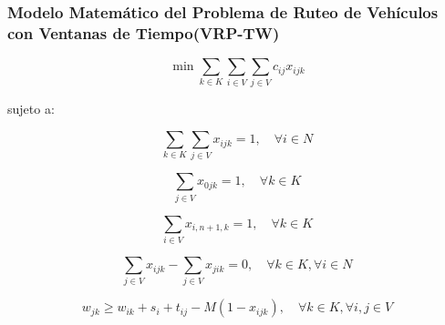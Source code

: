 \documentclass[12pt,titlepage,twoside,openright]{book}
\begin{document}
\subsubsection*{Modelo Matemático del Problema de Ruteo de Vehículos con Ventanas de Tiempo(VRP-TW)}

\begin{equation}
	\min \sum_{k \in K} \sum_{i \in V} \sum_{j \in V} c_{ij} x_{ijk}
	\label{eq:VRPTW_obj}
\end{equation}

sujeto a:

\begin{equation}
	\sum_{k \in K} \sum_{j \in V} x_{ijk} = 1, \quad \forall i \in N
	\label{eq:VRPTW_visit_once}
\end{equation}

\begin{equation}
	\sum_{j \in V} x_{0jk} = 1, \quad \forall k \in K
	\label{eq:VRPTW_start_depot}
\end{equation}

\begin{equation}
	\sum_{i \in V} x_{i,n+1,k} = 1, \quad \forall k \in K
	\label{eq:VRPTW_end_depot}
\end{equation}

\begin{equation}
	\sum_{j \in V} x_{ijk} - \sum_{j \in V} x_{jik} = 0, \quad \forall k \in K, \forall i \in N
	\label{eq:VRPTW_flow_balance}
\end{equation}

\begin{equation}
	w_{jk} \geq w_{ik} + s_i + t_{ij} - M (1 - x_{ijk}), \quad \forall k \in K, \forall i,j \in V
	\label{eq:VRPTW_time_window}
\end{equation}
\end{document}
